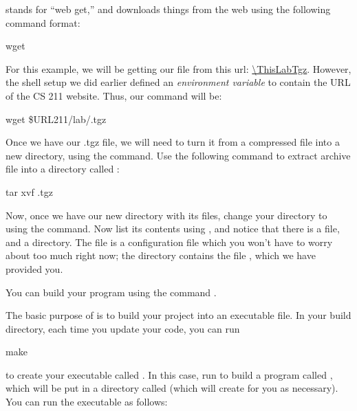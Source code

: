\documentclass{tufte-handout}
\begin{document}
 stands for ``web get,'' and downloads things from the web using the
following command format:

\begin{CmdLine}
  \prompt wget 
\end{CmdLine}

\noindent
For this example, we will be getting our file from this url:
\url{\ThisLabTgz}. However, the shell setup we did earlier defined
an \emph{environment variable} to contain the URL of the CS 211
website. Thus, our command will be:

\begin{CmdLine}
  \prompt wget \$URL211/lab/\ThisLabBase.tgz
\end{CmdLine}

Once we have our .tgz file, we will need to turn it from a compressed
file into a new directory, using the  command. Use the
following command to extract archive file into a directory called
\filename{\ThisLabBase}:

\begin{CmdLine}
  \prompt tar xvf \ThisLabBase.tgz
\end{CmdLine}

Now, once we have our new directory with its files, change your
directory to \filename{\ThisLabBase} using the  command.
Now list its contents using , and notice that there is a
 file, and a  directory. The
 file is a  configuration file which
you won't have to worry about too much right now; the 
directory contains the file , which we have provided
you.

You can build your program using the command .

The basic purpose of  is to build your project into an
executable file. In your build directory, each time you update your
code, you can run

\begin{CmdLine}
  \prompt make 
\end{CmdLine}

\noindent to create your executable called .  In
this case, run  to build a program called
, which will be put in a directory called
 (which  will create for you as
necessary). You can run the executable as follows:
\end{document}
